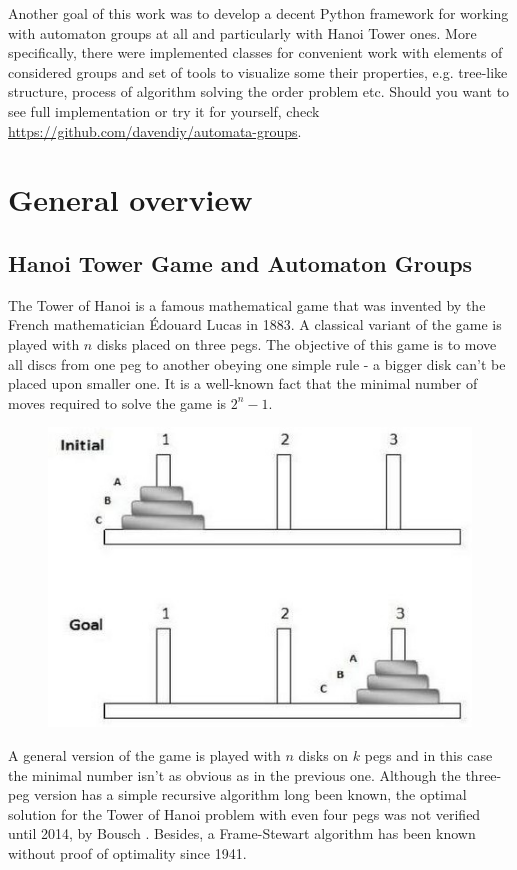 \documentclass[a4paper,12pt]{amsart}
\begin{document}
Another goal of this work was to develop a decent Python framework for working with automaton groups at all and particularly with Hanoi Tower ones. More specifically, there were implemented classes for convenient work with elements of considered groups and set of tools to visualize some their properties, e.g. tree-like structure, process of algorithm solving the order problem etc. Should you want to see full implementation or try it for yourself, check \url{https://github.com/davendiy/automata-groups}.

\newpage

\section{General overview}

\subsection{Hanoi Tower Game and Automaton Groups} 

The Tower of Hanoi is a famous mathematical game that was invented by the French mathematician Édouard Lucas in 1883. A classical variant of the game is played with $n$ disks placed on three pegs. The objective of this game is to move all discs from one peg to another obeying one simple rule - a bigger disk can't be placed upon smaller one. It is a well-known fact that the minimal number of moves required to solve the game is $2^n - 1$. 


\begin{figure}[h]
	\includegraphics[scale=0.4]{hanoi_tower.jpg}
\end{figure}


A general version of the game is played with $n$ disks on $k$ pegs and in this case the minimal number isn't as obvious as in the previous one. Although the three-peg version has a simple recursive algorithm long been known, the optimal solution for the Tower of Hanoi problem with even four pegs was not verified until 2014, by Bousch \cite{Bousch}. Besides, a Frame-Stewart algorithm has been known without proof of optimality since 1941. \cite{Frame-Stewart}
\end{document}
